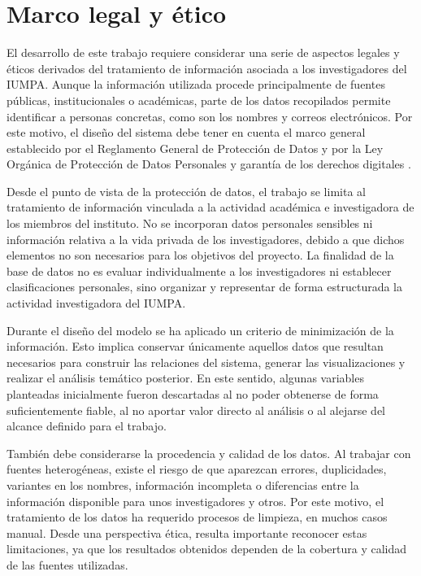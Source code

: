 \documentclass[11pt,spanish,listoffigures,listoftables]{tfgetsinf}
\begin{document}
\section{Marco legal y ético}

El desarrollo de este trabajo requiere considerar una serie de aspectos legales y éticos derivados del tratamiento de información asociada a los investigadores del IUMPA. Aunque la información utilizada procede principalmente de fuentes públicas, institucionales o académicas, parte de los datos recopilados permite identificar a personas concretas, como son los nombres y correos electrónicos. Por este motivo, el diseño del sistema debe tener en cuenta el marco general establecido por el Reglamento General de Protección de Datos y por la Ley Orgánica de Protección de Datos Personales y garantía de los derechos digitales \cite{RGPD2016,LOPDGDD2018}.

Desde el punto de vista de la protección de datos, el trabajo se limita al tratamiento de información vinculada a la actividad académica e investigadora de los miembros del instituto. No se incorporan datos personales sensibles ni información relativa a la vida privada de los investigadores, debido a que dichos elementos no son necesarios para los objetivos del proyecto. La finalidad de la base de datos no es evaluar individualmente a los investigadores ni establecer clasificaciones personales, sino organizar y representar de forma estructurada la actividad investigadora del IUMPA.

Durante el diseño del modelo se ha aplicado un criterio de minimización de la información. Esto implica conservar únicamente aquellos datos que resultan necesarios para construir las relaciones del sistema, generar las visualizaciones y realizar el análisis temático posterior. En este sentido, algunas variables planteadas inicialmente fueron descartadas al no poder obtenerse de forma suficientemente fiable, al no aportar valor directo al análisis o al alejarse del alcance definido para el trabajo.

También debe considerarse la procedencia y calidad de los datos. Al trabajar con fuentes heterogéneas, existe el riesgo de que aparezcan errores, duplicidades, variantes en los nombres, información incompleta o diferencias entre la información disponible para unos investigadores y otros. Por este motivo, el tratamiento de los datos ha requerido procesos de limpieza, en muchos casos manual. Desde una perspectiva ética, resulta importante reconocer estas limitaciones, ya que los resultados obtenidos dependen de la cobertura y calidad de las fuentes utilizadas.
\end{document}
